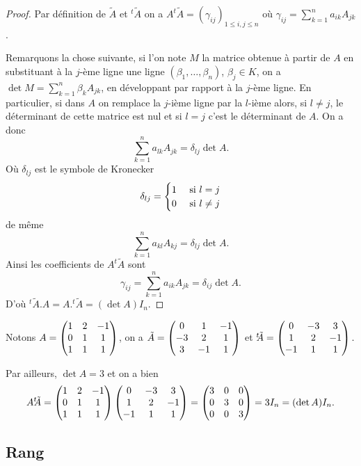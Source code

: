 \documentclass[class=report,crop=false]{standalone}
\begin{document}
\begin{proof}
Par définition de $\tilde A$ et $^t\!\!\tilde A$ on a 
$A^t\!\!\tilde A=(\gamma_{ij})_{1\leq i,j\leq n}$ où $\gamma_{ij}=\sum_{k=1}^na_{ik}A_{jk}$.

Remarquons la chose suivante, si l'on note $M$ la matrice obtenue à partir de $A$ en substituant à la $j$-ème ligne une ligne $(\beta_1,\dots,\beta_n)$, $\beta_j\in K$, on a $\det M=\sum_{k=1}^n \beta_k A_{jk}$, en développant par rapport à la $j$-ème ligne. En particulier, si dans $A$ on remplace la $j$-ième ligne par la $l$-ième alors, si $l\neq j$, le déterminant de cette matrice est nul et si $l=j$ c'est le déterminant de $A$. On a donc
$$\sum_{k=1}^na_{lk}A_{jk}=\delta_{lj}\det A.$$
Où $\delta_{lj}$ est le symbole de Kronecker 
$$\delta_{lj}=\begin{cases}1 & \text{ si } l=j\cr 0& \text{ si } l\neq j\end{cases}$$
de même
$$\sum_{k=1}^n a_{kl}A_{kj}=\delta_{lj}\det A.$$
Ainsi les coefficients de $A^t\!\!\tilde A$ sont
$$\gamma_{ij}=\sum_{k=1}^n a_{ik}A_{jk}=\delta_{ij}\det A.$$
D'où $^t\!\!\tilde A.A=A.^t\!\!\tilde A=(\det A)I_n.$
\end{proof}



\begin{exemple}
Notons $A=\left(\begin{matrix}1&2&-1\cr 0&1&1\cr1&1&1\end{matrix}\right)$, on a 
$\tilde A=\left(\begin{matrix}0&1&-1\cr-3&2&1\cr3&-1&1\end{matrix}\right)$ et 
$^t\!\!\tilde A=\left(\begin{matrix}0&-3&3\cr1&2&-1\cr-1&1&1\end{matrix}\right).$

Par ailleurs, $\det A=3$ et on a bien 
$$A^t\!\!\tilde A=\left(\begin{matrix}1&2&-1\cr 0&1&1\cr1&1&1\end{matrix}\right)
\left(\begin{matrix}0&-3&3\cr1&2&-1\cr-1&1&1\end{matrix}\right)=
\left(\begin{matrix}3&0&0\cr0&3&0\cr0&0&3\end{matrix}\right)=3I_n=(\det A)I_n.$$
\end{exemple}


\subsection{Rang}
\end{document}
